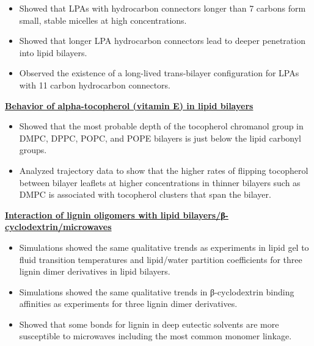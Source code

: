 \begin{cventries}
{\begin{cvitems}
                \vspace{2pt}
                \begin{itemize}
                \item {Showed that LPAs with hydrocarbon connectors longer than 7 carbons form small, stable micelles at high concentrations.}
                \item {Showed that longer LPA hydrocarbon connectors lead to deeper penetration into lipid bilayers.}
                \item {Observed the existence of a long-lived trans-bilayer configuration for LPAs with 11 carbon hydrocarbon connectors.}
                \end{itemize}
            \item {\textbf{\underline{Behavior of alpha-tocopherol (vitamin E) in lipid bilayers}}}
                \vspace{2pt}
                \begin{itemize}
                \item {Showed that the most probable depth of the tocopherol chromanol group in DMPC, DPPC, POPC, and POPE bilayers is just below the lipid carbonyl groups.}
                \item {Analyzed trajectory data to show that the higher rates of flipping tocopherol between bilayer leaflets at higher concentrations in thinner bilayers such as DMPC is associated with tocopherol clusters that span the bilayer.}
                \end{itemize}
            \item {\textbf{\underline{Interaction of lignin oligomers with lipid bilayers/β-cyclodextrin/microwaves}}}
                \vspace{2pt}
                \begin{itemize}
                    \item {Simulations showed the same qualitative trends as experiments in lipid gel to fluid transition temperatures and lipid/water partition coefficients for three lignin dimer derivatives in lipid bilayers.}
                    \item {Simulations showed the same qualitative trends in β-cyclodextrin binding affinities as experiments for three lignin dimer derivatives.}
                    \item {Showed that some bonds for lignin in deep eutectic solvents are more susceptible to microwaves including the most common monomer linkage.}
                \end{itemize}            

\end{cvitems}}
\end{cventries}
